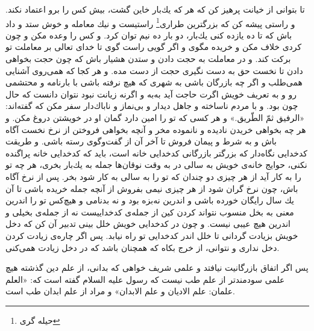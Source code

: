 تا بتوانى از خيانت پرهيز كن كه هر كه يك‌بار خاين گشت، بيش كس را برو اعتماد نكند. و راستى پيشه كن كه بزرگترين طرارى\footnote{حیله گری} راستيست و نيك معامله و خوش ستد و داد باش كه تا ده يازده كنى يك‌بار، دو بار ده نيم توان كرد. و كس را وعده مكن و چون كردى خلاف مكن و خريده مگوى و اگر گويى راست گوى تا خداى تعالى بر معاملت تو بركت كند. و در معاملت به حجت دادن و ستدن هشيار باش كه چون حجت بخواهى دادن تا نخست حق به دست نگيرى حجت از دست مده. و هر كجا كه همى‌روى آشنايى همى‌طلب و اگر چه بازرگان باشى به شهرى كه هيچ نرفته باشى با بارنامه و محتشمى رو و به تعريف خويش اگرت حاجت آيد به‌به و اگرنه زيانت نبود نتوان دانست كه حال چون بود. و با مردم ناساخته و جاهل ديدار و بى‌نماز و ناباك‌دار سفر مكن كه گفته‌اند: «الرفيق ثمّ الطّريق.» و هر كسى كه تو را امين دارد گمان او در خويشتن دروغ مكن. و هر چه بخواهى خريدن ناديده و نانموده مخر و آنچه بخواهى فروختن از نرخ نخست آگاه باش و به شرط و پيمان فروش تا آخر آن از گفت‌و‌گوى رسته باشى. و طريقت كدخدايى نگاه‌دار كه بزرگتر بازرگانى كدخدايى خانه است، بايد كه كدخدايى خانه پراگنده نكنى، حوايج خانه‌ی خويش به سالى در به وقت نوقان‌ها جمله به يك‌بار بخرى، هر چه تو را به كار آيد از هر چيزى دو چندان كه تو را به سالى به كار شود بخر. پس از نرخ آگاه باش، چون نرخ گران شود از هر چيزى نيمى بفروش از آنچه جمله خريده باشى تا آن يك سال رايگان خورده باشى و اندرين نه‌بزه بود و نه بد‌نامى و هيچ‌كس تو را اندرين معنى به بخل منسوب نتواند كردن كين از جمله‌ی كدخداييست نه از جمله‌ی بخيلى و اندرين هيچ عيبى نيست. و چون در كدخدايى خويش خلل بينى تدبير آن كن كه دخل خويش بزيادت گردانى تا خلل اندر كدخدايى تو راه نيابد. پس اگر چاره‌ی زيادت كردن دخل ندارى و نتوانى، از خرج بكاه كه همچنان باشد كه در دخل زيادت همى‌كنى.

پس اگر اتفاق بازرگانيت نيافتد و علمى شريف خواهى كه بدانى، از علم دين گذشته هيچ علمى سودمندتر از علم طب نيست كه رسول عليه السلام گفته است كه: «العلم علمان: علم الاديان و علم الابدان» و مراد از علم ابدان طب است.


\newpage
